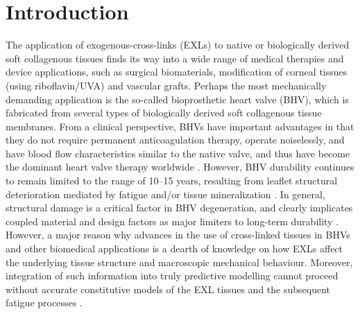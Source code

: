 \section{Introduction}

    The application of exogenous-cross-links (EXLs) to native or biologically derived soft collagenous tissues finds its way into a wide range of medical therapies and device applications, such as surgical biomaterials, modification of corneal tissues (using riboflavin/UVA) and vascular grafts. Perhaps the most mechanically demanding application is the so-called bioprosthetic heart valve (BHV), which is fabricated from several types of biologically derived soft collagenous tissue membranes. From a clinical perspective, BHVs have important advantages in that they do not require permanent anticoagulation therapy, operate noiselessly, and have blood flow characteristics similar to the native valve, and thus have become the dominant heart valve therapy worldwide \cite{bini_noncollagenous_1999}\cite{schoen_cardiac_2005}\cite{schoen_founders_1999}. However, BHV durability continues to remain limited to the range of 10–15 years, resulting from leaflet structural deterioration mediated by fatigue and/or tissue mineralization \cite{vesely_tissue_2001}\cite{sacks_calcification_1999}. In general, structural damage is a critical factor in BHV degeneration, and clearly implicates coupled material and design factors as major limiters to long-term durability \cite{schoen_calcification_2005}\cite{schoen_pathology_2001}. However, a major reason why advances in the use of cross-linked tissues in BHVs and other biomedical applications is a dearth of knowledge on how EXLs affect the underlying tissue structure and macroscopic mechanical behaviour. Moreover, integration of such information into truly predictive modelling cannot proceed without accurate constitutive models of the EXL tissues and the subsequent fatigue processes \cite{sacks_incorporation_2003}\cite{sun_finite_2005}.



